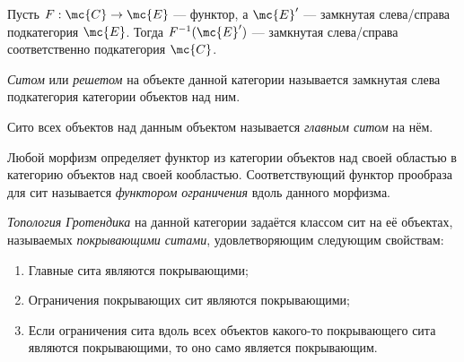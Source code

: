 \documentclass[
	extrafontsizes,
	11pt,
	hyphens,
]{memoir}
\begin{document}
\begin{observation}
Пусть \(F : \mc{C} \to \mc{E}\) --- функтор, а \(\mc{E}'\) --- замкнутая слева/справа подкатегория \(\mc{E}\).
Тогда \(F^{-1}(\mc{E}')\) --- замкнутая слева/справа соответственно подкатегория \(\mc{C}\).
\end{observation}

\begin{definition}
\emph{Ситом} или \emph{решетом} на объекте данной категории называется замкнутая слева подкатегория категории объектов над ним.
\end{definition}

\begin{definition}
Сито всех объектов над данным объектом называется \emph{главным ситом} на нём.
\end{definition}


\begin{definition}
Любой морфизм определяет функтор из категории объектов над своей областью в категорию объектов над своей кообластью. Соответствующий функтор прообраза для сит называется \emph{функтором ограничения} вдоль данного морфизма.
\end{definition}


\begin{definition}
\emph{Топология Гротендика} на данной категории задаётся классом сит на её объектах, называемых \emph{покрывающими ситами}, удовлетворяющим следующим свойствам:
\begin{enumerate}[
	font=\upshape,
	label=\asbuk*),
	ref=\asbuk*,
	]

\item Главные сита являются покрывающими;

\item Ограничения покрывающих сит являются покрывающими;

\item Если ограничения сита вдоль всех объектов какого-то покрывающего сита являются покрывающими, то оно само является покрывающим.

\end{enumerate}
\end{definition}
\end{document}

